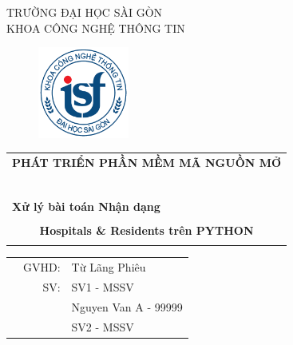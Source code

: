 \documentclass[a4paper]{article}
\begin{document}
\begin{titlepage}
    \begin{center}
        TRƯỜNG ĐẠI HỌC SÀI GÒN \\
        KHOA CÔNG NGHỆ THÔNG TIN
    \end{center}
    \vspace{1cm}

    \begin{figure}[h!]
        \begin{center}
            \includegraphics[width=3cm]{logoITSGU.png}
        \end{center}
    \end{figure}

    \vspace{1cm}


    \begin{center}
        \begin{tabular}{c}
            \multicolumn{1}{l}{\textbf{{\Large PHÁT TRIỂN PHẦN MỀM MÃ NGUỒN MỞ}}} \\
            ~~                                                                    \\
            \hline
            \\
            \multicolumn{1}{l}{\textbf{{\Large Xử lý bài toán Nhận dạng}}}        \\
            \\

            \textbf{{\Huge Hospitals \& Residents trên PYTHON}}                   \\
            \\
            \hline
        \end{tabular}
    \end{center}

    \vspace{3cm}

    \begin{table}[h]
        \begin{tabular}{rrl}
            \hspace{5 cm} & GVHD: & Từ Lãng Phiêu        \\
                          & SV:   & SV1 - MSSV           \\
                          &       & Nguyen Van A - 99999 \\
                          &       & SV2 - MSSV           \\
        \end{tabular}
        \vspace{1.5 cm}
    \end{table}


\end{titlepage}
\end{document}
